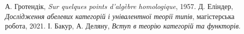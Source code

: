\documentclass{article}
\begin{document}
\begin{thebibliography}{9}
 А. Гротендік, \emph{Sur quelques points d'algèbre homologique}, 1957.
 Д. Еліндер, \emph{Дослідження абелевих категорій і унівалентної теорії типів}, магістерська робота, 2021.
 І. Бакур, А. Деляну, \emph{Вступ в теорію категорій та функторів}.
\end{thebibliography}
\end{document}
